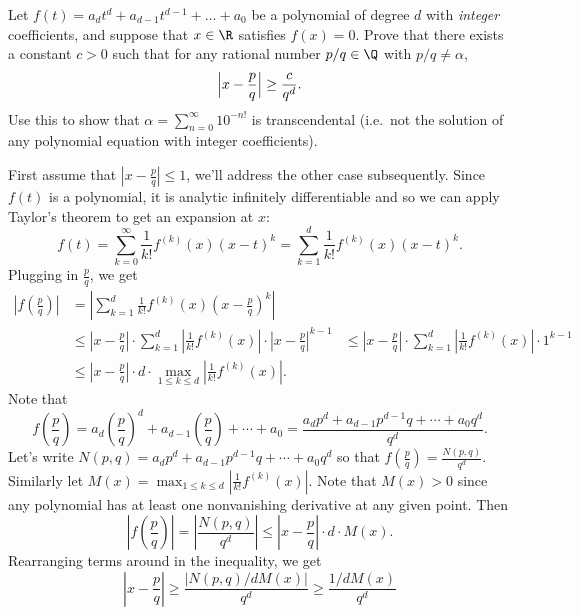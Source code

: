 \documentclass[11pt,letterpaper]{article}
\begin{document}
\begin{problem}
    Let $f(t)=a_d t^d+a_{d-1} t^{d-1}+\dots+a_0$ be a polynomial of degree $d$ with {\em integer} coefficients, and suppose that $x\in \R$ satisfies $f(x)=0$. Prove that there exists a constant $c>0$ such that for any rational number $p/q\in \Q$ with $p/q\neq \alpha$, 
    \[
        \Bigl|x-\frac{p}{q}\Bigr|\geq \frac{c}{q^d}
    .\] 
    Use this to show that $\alpha=\sum_{n=0}^\infty 10^{-n!}$ is transcendental (i.e.\ not the solution of any polynomial equation with integer coefficients).
\end{problem}

\begin{solution}
    First assume that $\left|x-\frac{p}{q}\right|\leq 1$, we'll address the other case subsequently. Since $f(t)$ is a polynomial, it is analytic infinitely differentiable and so we can apply Taylor's theorem to get an expansion at $x$:
    \[
        f(t)=\sum^\infty_{k=0}\frac{1}{k!}f^{(k)}(x)(x-t)^k=\sum^d_{k=1}\frac{1}{k!}f^{(k)}(x)(x-t)^k
    .\] 
    Plugging in $\frac{p}{q}$, we get
    \[
        \begin{aligned}
            \left|f\left(\frac{p}{q}\right)\right| &= \left|\sum^d_{k=1}\frac{1}{k!}f^{(k)}(x)\left(x-\frac{p}{q}\right)^k\right|\\
            &\leq \left|x-\frac{p}{q}\right|\cdot \sum^d_{k=1}\left|\frac{1}{k!}f^{(k)}(x)\right|\cdot \left|x-\frac{p}{q}\right|^{k-1}
            &\leq \left|x-\frac{p}{q}\right|\cdot \sum^d_{k=1}\left|\frac{1}{k!}f^{(k)}(x)\right|\cdot 1^{k-1}\\
            &\leq \left|x-\frac{p}{q}\right|\cdot d \cdot \max_{1\leq k \leq d}\left|\frac{1}{k!}f^{(k)}(x)\right|.
        \end{aligned}
    \]  
    Note that 
    \[
        f\left(\frac{p}{q}\right)=a_d\left(\frac{p}{q}\right)^d+a_{d-1}\left(\frac{p}{q}\right)+\cdots+a_0=\frac{a_dp^d+a_{d-1}p^{d-1}q+\cdots+a_0q^d}{q^d}
    .\]  
    Let's write $N(p,q)=a_dp^d+a_{d-1}p^{d-1}q+\cdots+a_0q^d$ so that $f\left(\frac{p}{q}\right)=\frac{N(p,q)}{q^d}$. Similarly let $M(x)=\max_{1\leq k\leq d}\left|\frac{1}{k!}f^{(k)}(x)\right|$. Note that $M(x)>0$ since any polynomial has at least one nonvanishing derivative at any given point. Then 
    \[
        \left|f\left(\frac{p}{q}\right)\right|=\left|\frac{N(p,q)}{q^d}\right|\leq \left|x-\frac{p}{q}\right|\cdot d\cdot M(x).
    \]   
    Rearranging terms around in the inequality, we get
    \[
        \left|x-\frac{p}{q}\right|\geq \frac{\left|N(p,q) /dM(x)\right|}{q^d}\geq \frac{1/dM(x)}{q^d}
\]
\end{solution}
\end{document}
